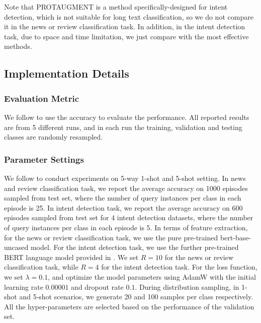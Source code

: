 \documentclass[letterpaper]{article} %
\begin{document}
Note that PROTAUGMENT is a method specifically-designed for intent detection, which is not suitable for long text classification, so we do not compare it in the news or review classification task. In addition, in the intent detection task, due to space and time limitation, we just compare with the most effective methods.

\subsection{Implementation Details}

\subsubsection{Evaluation Metric}  
We follow \cite{ContrastNet} to use the accuracy to evaluate the performance. All reported results are from 5 different runs, and in each run the training, validation and testing classes are randomly resampled.

\subsubsection{Parameter Settings}
We follow \cite{ContrastNet} to conduct experiments on 5-way 1-shot and 5-shot setting. In news and review classification task, we report the average accuracy on 1000 episodes sampled from test set, where the number of query instances per class in each episode is 25. In intent detection task, we report the average accuracy on 600 episodes sampled from test set for 4 intent detection datasets,  where the number of query instances per class in each episode is 5. In terms of feature extraction, for the news or review classification task, we use the pure pre-trained bert-base-uncased model. For the intent detection task, we use the further pre-trained BERT language model provided in \cite{ProtAugment}. We set $R = 10$ for the news or review classification task, while $R = 4$ for the intent detection task. For the loss function, we set $\lambda=0.1$, and optimize the model parameters using AdamW \cite{iclr/LoshchilovH19} with the initial learning rate $0.00001$ and dropout rate $0.1$. During distribution sampling, in 1-shot and 5-shot scenarios, we generate 20 and 100 samples per class respectively. All the hyper-parameters are selected based on the performance of the validation set.
\end{document}
